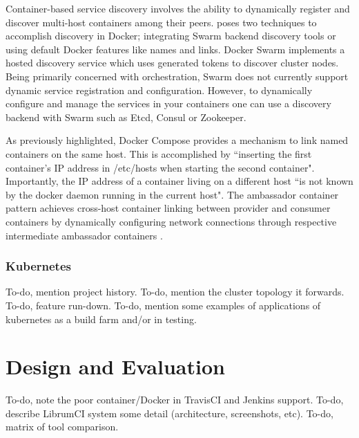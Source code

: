 \documentclass{report}
\begin{document}
\par 
Container-based service discovery involves the ability to dynamically register and discover multi-host containers among their peers. \citet{holla} poses two techniques to accomplish discovery in Docker; integrating Swarm backend discovery tools or using default Docker features like names and links. Docker Swarm implements a hosted discovery service which uses generated tokens to discover cluster nodes. Being primarily concerned with orchestration, Swarm does not currently support dynamic service registration and configuration. However, to dynamically configure and manage the services in your containers one can use a discovery backend with Swarm such as Etcd, Consul or Zookeeper. 
\par
As previously highlighted, Docker Compose provides a mechanism to link named containers on the same host. This is accomplished by ``inserting the first container's IP address in /etc/hosts when starting the second container". Importantly, the IP address of a container living on a different host ``is not known by the docker daemon running in the current host". The ambassador container pattern achieves cross-host container linking between provider and consumer containers by dynamically configuring network connections through respective intermediate ambassador containers \citep{holla}.

\subsubsection{Kubernetes}
To-do, mention project history. To-do, mention the cluster topology it forwards. To-do, feature run-down. To-do, mention some examples of applications of kubernetes as a build farm and/or in testing.
\lipsum[1] 

\section{Design and Evaluation}
To-do, note the poor container/Docker in TravisCI and Jenkins support. To-do, describe LibrumCI system some detail (architecture, screenshots, etc). To-do, matrix of tool comparison.
\end{document}
